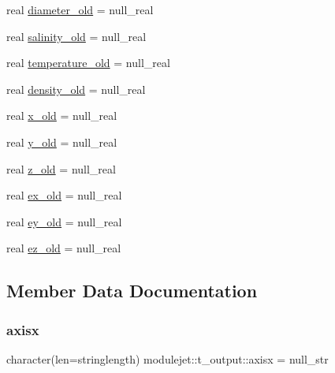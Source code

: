 \begin{DoxyCompactItemize}
\item 
real \mbox{\hyperlink{structmodulejet_1_1t__output_a64befc09b692beae0e2dbaabfea53331}{diameter\+\_\+old}} = null\+\_\+real
\item 
real \mbox{\hyperlink{structmodulejet_1_1t__output_a9fa032da98ffca7e9a1810aae4d63416}{salinity\+\_\+old}} = null\+\_\+real
\item 
real \mbox{\hyperlink{structmodulejet_1_1t__output_a0fd2f52eb2ece39abf0bc4e94d405e9e}{temperature\+\_\+old}} = null\+\_\+real
\item 
real \mbox{\hyperlink{structmodulejet_1_1t__output_af90c2cc7d61efc27eb8a3299963e3709}{density\+\_\+old}} = null\+\_\+real
\item 
real \mbox{\hyperlink{structmodulejet_1_1t__output_a80f5de6a0462925da322f89e93f00406}{x\+\_\+old}} = null\+\_\+real
\item 
real \mbox{\hyperlink{structmodulejet_1_1t__output_a989e1081ca97a4b20d257cd986b05bb3}{y\+\_\+old}} = null\+\_\+real
\item 
real \mbox{\hyperlink{structmodulejet_1_1t__output_ac697512f8b7efe16219e64b6f7d2af24}{z\+\_\+old}} = null\+\_\+real
\item 
real \mbox{\hyperlink{structmodulejet_1_1t__output_a68a7d45406d85301a47d225f735565ef}{ex\+\_\+old}} = null\+\_\+real
\item 
real \mbox{\hyperlink{structmodulejet_1_1t__output_a8fbb3507f3ac75fdc2391aeffbd4664c}{ey\+\_\+old}} = null\+\_\+real
\item 
real \mbox{\hyperlink{structmodulejet_1_1t__output_a8b3c0b003ae4be1a1beeac28c1599729}{ez\+\_\+old}} = null\+\_\+real
\end{DoxyCompactItemize}


\subsection{Member Data Documentation}
\mbox{\label{structmodulejet_1_1t__output_a1faed64c683b71938b84f590ef846d67}} 
\subsubsection{\texorpdfstring{axisx}{axisx}}
{\footnotesize\ttfamily character(len=stringlength) modulejet\+::t\+\_\+output\+::axisx = null\+\_\+str\hspace{0.3cm}{\ttfamily [private]}}

